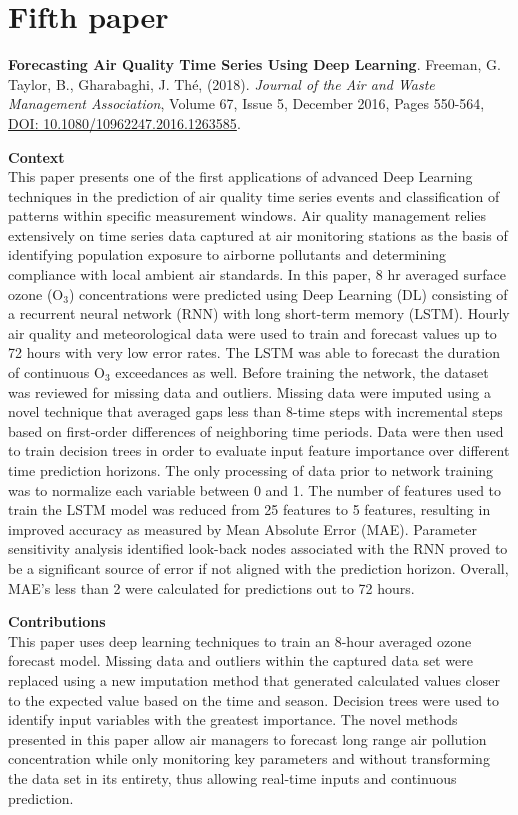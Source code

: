 \section{Fifth paper}
\noindent
\textbf{Forecasting Air Quality Time Series Using Deep Learning}. Freeman, G. Taylor, B., Gharabaghi, J.  Th\'e, (2018).  \textit{Journal of the Air and Waste Management Association}, Volume 67, Issue 5, December 2016, Pages 550-564, \url{DOI: 10.1080/10962247.2016.1263585}.

\vspace{5mm}
\noindent
\textbf{Context}\\
\noindent
This paper presents one of the first applications of advanced Deep Learning techniques in the prediction of air quality time series events and classification of patterns within specific measurement windows. Air quality management relies extensively on time series data captured at air monitoring stations as the basis of identifying population exposure to airborne pollutants and determining compliance with local ambient air standards. In this paper, 8 hr averaged surface ozone (O$_{3}$) concentrations were predicted using Deep Learning (DL) consisting of a recurrent neural network (RNN) with long short-term memory (LSTM). Hourly air quality and meteorological data were used to train and forecast values up to 72 hours with very low error rates. The LSTM was able to forecast the duration of continuous O$_{3}$ exceedances as well. Before training the network, the dataset was reviewed for missing data and outliers. Missing data were imputed using a novel technique that averaged gaps less than 8-time steps with incremental steps based on first-order differences of neighboring time periods. Data were then used to train decision trees in order to evaluate input feature importance over different time prediction horizons. The only processing of data prior to network training was to normalize each variable between 0 and 1. The number of features used to train the LSTM model was reduced from 25 features to 5 features, resulting in improved accuracy as measured by Mean Absolute Error (MAE). Parameter sensitivity analysis identified look-back nodes associated with the RNN proved to be a significant source of error if not aligned with the prediction horizon. Overall, MAE's less than 2 were calculated for predictions out to 72 hours. 

\vspace{5mm}
\noindent
\textbf{Contributions}\\
\noindent
This paper uses deep learning techniques to train an 8-hour averaged ozone forecast model. Missing data and outliers within the captured data set were replaced using a new imputation method that generated calculated values closer to the expected value based on the time and season. Decision trees were used to identify input variables with the greatest importance. The novel methods presented in this paper allow air managers to forecast long range air pollution concentration while only monitoring key parameters and without transforming the data set in its entirety, thus allowing real-time inputs and continuous prediction.

